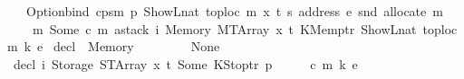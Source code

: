 \begin{isabellebody}
\ \ \ Option{\isachardot}{\kern0pt}bind\ {\isacharparenleft}{\kern0pt}cps{}m\ p\ {\isacharparenleft}{\kern0pt}ShowL\isactrlsub n\isactrlsub a\isactrlsub t\ {\isacharparenleft}{\kern0pt}toploc\ m{\isacharparenright}{\kern0pt}{\isacharparenright}{\kern0pt}\ x{\isacharprime}{\kern0pt}\ t{\isacharprime}{\kern0pt}\ {\isacharparenleft}{\kern0pt}s\ {\isacharparenleft}{\kern0pt}address\ e{\isacharparenright}{\kern0pt}{\isacharparenright}{\kern0pt}\ {\isacharparenleft}{\kern0pt}snd\ {\isacharparenleft}{\kern0pt}allocate\ m{\isacharparenright}{\kern0pt}{\isacharparenright}{\kern0pt}{\isacharparenright}{\kern0pt}\isanewline
\ \ \ \ {\isacharparenleft}{\kern0pt}{\isasymlambda}m{\isacharprime}{\kern0pt}{\isacharprime}{\kern0pt}{\isachardot}{\kern0pt}\ Some\ {\isacharparenleft}{\kern0pt}c{\isacharcomma}{\kern0pt}\ m{\isacharprime}{\kern0pt}{\isacharprime}{\kern0pt}{\isacharcomma}{\kern0pt}\ astack\ i\ {\isacharparenleft}{\kern0pt}Memory\ {\isacharparenleft}{\kern0pt}MTArray\ x\ t{\isacharparenright}{\kern0pt}{\isacharparenright}{\kern0pt}\ {\isacharparenleft}{\kern0pt}KMemptr\ {\isacharparenleft}{\kern0pt}ShowL\isactrlsub n\isactrlsub a\isactrlsub t\ {\isacharparenleft}{\kern0pt}toploc\ m{\isacharparenright}{\kern0pt}{\isacharparenright}{\kern0pt}{\isacharparenright}{\kern0pt}\ {\isacharparenleft}{\kern0pt}k{\isacharcomma}{\kern0pt}\ e{\isacharparenright}{\kern0pt}{\isacharparenright}{\kern0pt}{\isacharparenright}{\kern0pt}{\isachardoublequoteclose}\isanewline
{\isacharbar}{\kern0pt}\ {\isachardoublequoteopen}decl\ {\isacharunderscore}{\kern0pt}\ {\isacharparenleft}{\kern0pt}Memory\ {\isacharunderscore}{\kern0pt}{\isacharparenright}{\kern0pt}\ {\isacharunderscore}{\kern0pt}\ {\isacharunderscore}{\kern0pt}\ {\isacharunderscore}{\kern0pt}\ {\isacharunderscore}{\kern0pt}\ {\isacharunderscore}{\kern0pt}\ {\isacharunderscore}{\kern0pt}\ {\isacharequal}{\kern0pt}\ None{\isachardoublequoteclose}\isanewline
\isanewline
\isanewline
{\isacharbar}{\kern0pt}\ {\isachardoublequoteopen}decl\ i\ {\isacharparenleft}{\kern0pt}Storage\ {\isacharparenleft}{\kern0pt}STArray\ x\ t{\isacharparenright}{\kern0pt}{\isacharparenright}{\kern0pt}\ {\isacharparenleft}{\kern0pt}Some\ {\isacharparenleft}{\kern0pt}KStoptr\ p{\isacharcomma}{\kern0pt}\ {\isacharunderscore}{\kern0pt}{\isacharparenright}{\kern0pt}{\isacharparenright}{\kern0pt}\ {\isacharunderscore}{\kern0pt}\ {\isacharunderscore}{\kern0pt}\ {\isacharunderscore}{\kern0pt}\ {\isacharunderscore}{\kern0pt}\ {\isacharparenleft}{\kern0pt}c{\isacharcomma}{\kern0pt}\ m{\isacharcomma}{\kern0pt}\ k{\isacharcomma}{\kern0pt}\ e{\isacharparenright}{\kern0pt}\ {\isacharequal}{\kern0pt}\isanewline

\end{isabellebody}
